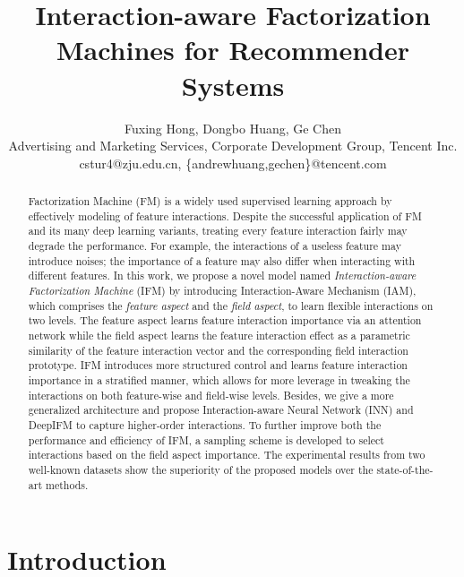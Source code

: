 \documentclass[letterpaper]{article} \usepackage{aaai19}  \usepackage{times}  \usepackage{helvet}  \usepackage{courier}  \usepackage{url}  \usepackage{graphicx}  \frenchspacing  \setlength{\pdfpagewidth}{8.5in}  \setlength{\pdfpageheight}{11in}  \usepackage{mathtools}
\title{Interaction-aware Factorization Machines for Recommender Systems}
\author{Fuxing Hong, Dongbo Huang, Ge Chen \\
Advertising and Marketing Services, Corporate Development Group, Tencent Inc.\\
cstur4@zju.edu.cn, \{andrewhuang,gechen\}@tencent.com \\
}
\begin{document}
\maketitle
\begin{abstract}
Factorization Machine (FM) is a widely used supervised learning approach by effectively modeling of feature interactions. Despite the successful application of FM and its many deep learning variants, treating every feature interaction fairly may degrade the performance. For example, the interactions of a useless feature may introduce noises; the importance of a feature may also differ when interacting with different features. In this work, we propose a novel model named \emph{Interaction-aware Factorization Machine} (IFM) by introducing Interaction-Aware Mechanism (IAM), which comprises the \emph{feature aspect} and the \emph{field aspect}, to learn flexible interactions on two levels. The feature aspect learns feature interaction importance via an attention network while the field aspect learns the feature interaction effect as a parametric similarity of the feature interaction vector and the corresponding field interaction prototype. IFM introduces more structured control and learns feature interaction importance in a stratified manner, which allows for more leverage in tweaking the interactions on both feature-wise and field-wise levels. Besides, we give a more generalized architecture and propose Interaction-aware Neural Network (INN) and DeepIFM to capture higher-order interactions. To further improve both the performance and efficiency of IFM, a sampling scheme is developed to select interactions based on the field aspect importance. The experimental results from two well-known datasets show the superiority of the proposed models over the state-of-the-art methods.

\end{abstract}

\section{Introduction}
\label{sec:introduction}
\end{document}
